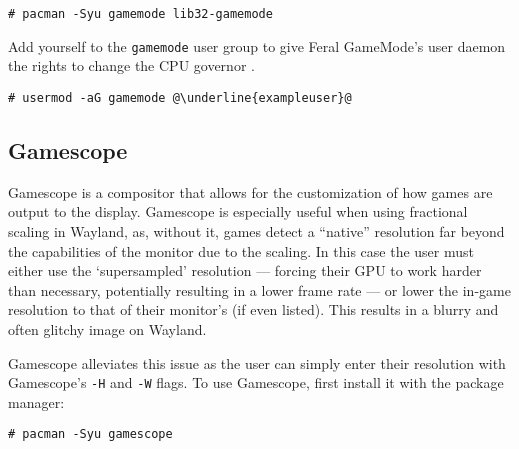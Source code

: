 \documentclass[a4paper]{article}
\begin{document}
\begin{lstlisting}
# pacman -Syu gamemode lib32-gamemode
\end{lstlisting}

Add yourself to the \lstinline|gamemode| user group to give Feral GameMode's user daemon the rights to change the CPU governor \cite{arch-wiki-gamemode}.
\begin{lstlisting}[escapechar=@]
# usermod -aG gamemode @\underline{exampleuser}@
\end{lstlisting}

\subsection{Gamescope}

Gamescope is a compositor that allows for the customization of how games are output to the display.
Gamescope is especially useful when using fractional scaling in Wayland, as, without it, games detect a ``native'' resolution far beyond the capabilities of the monitor due to the scaling.
In this case the user must either use the `supersampled' resolution --- forcing their GPU to work harder than necessary, potentially resulting in a lower frame rate --- or lower the in-game resolution to that of their monitor's (if even listed).
This results in a blurry and often glitchy image on Wayland.

Gamescope alleviates this issue as the user can simply enter their resolution with Gamescope's \lstinline|-H| and \lstinline|-W| flags.
To use Gamescope, first install it with the package manager:
\begin{lstlisting}
# pacman -Syu gamescope
\end{lstlisting}
\end{document}
